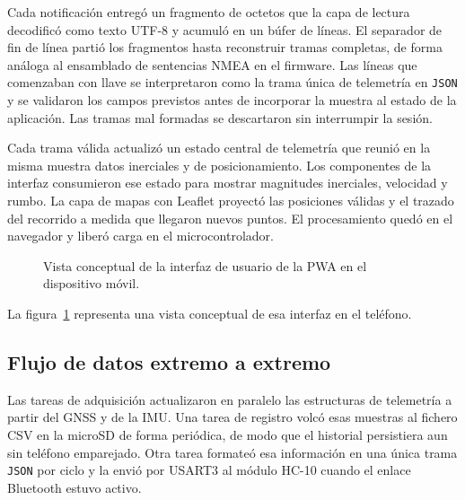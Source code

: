Cada notificación entregó un fragmento de octetos que la capa de lectura decodificó como texto UTF-8 y acumuló en un búfer de líneas. El separador de fin de línea partió los fragmentos hasta reconstruir tramas completas, de forma análoga al ensamblado de sentencias NMEA en el firmware. Las líneas que comenzaban con llave se interpretaron como la trama única de telemetría en \texttt{JSON} y se validaron los campos previstos antes de incorporar la muestra al estado de la aplicación. Las tramas mal formadas se descartaron sin interrumpir la sesión.

Cada trama válida actualizó un estado central de telemetría que reunió en la misma muestra datos inerciales y de posicionamiento. Los componentes de la interfaz consumieron ese estado para mostrar magnitudes inerciales, velocidad y rumbo. La capa de mapas con Leaflet \citep{leaflet} proyectó las posiciones válidas y el trazado del recorrido a medida que llegaron nuevos puntos. El procesamiento quedó en el navegador y liberó carga en el microcontrolador.

\begin{figure}[H]
	\centering
	\caption[Interfaz en el móvil]{Vista conceptual de la interfaz de usuario de la PWA en el dispositivo móvil.}
	\label{fig:cap3-ui-movil}
\end{figure}

La figura~\ref{fig:cap3-ui-movil} representa una vista conceptual de esa interfaz en el teléfono.

\subsection{Flujo de datos extremo a extremo}

Las tareas de adquisición actualizaron en paralelo las estructuras de telemetría a partir del GNSS y de la IMU. Una tarea de registro volcó esas muestras al fichero CSV en la microSD de forma periódica, de modo que el historial persistiera aun sin teléfono emparejado. Otra tarea formateó esa información en una única trama \texttt{JSON} por ciclo y la envió por USART3 al módulo HC-10 cuando el enlace Bluetooth estuvo activo.

